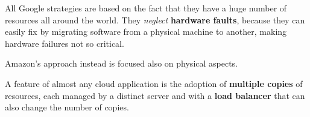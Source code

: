 All Google strategies are based on the fact that they have a huge number of resources all around the world.
They \textit{neglect} \textbf{hardware faults},
because they can easily fix by migrating software from a physical machine to another,
making hardware failures not so critical.

Amazon's approach instead is focused also on physical aspects.

A feature of almost any cloud application is the adoption of \textbf{multiple copies} of resources, each managed by a distinct server and with a \textbf{load balancer} that can also change the number of copies.

